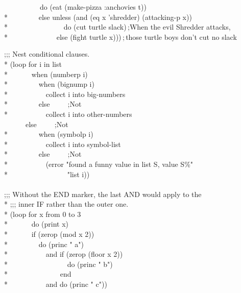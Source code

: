 \begin{defloop}
\begin{lisp}
~~~~~~~~~~do (eat (make-pizza :anchovies t)) \\*
~~~~~~~~else unless (and (eq x 'shredder) (attacking-p x))\\*
~~~~~~~~~~~~~~~do (cut turtle slack)\,;\textrm{When the evil Shredder attacks,} \\*
~~~~~~~~~~~~~else (fight turtle x)))\,;\,\textrm{those turtle boys don't cut no slack}
\end{lisp}
\goodbreak
\begin{lisp}
;;; Nest conditional clauses. \\*
(loop for i in list \\*
~~~~~~when (numberp i) \\*
~~~~~~~~when (bignump i) \\*
~~~~~~~~~~collect i into big-numbers \\*
~~~~~~~~else~~~~~;\textrm{Not } \\*
~~~~~~~~~~collect i into other-numbers \\
~~~~~~else~~~~~;\textrm{Not } \\*
~~~~~~~~when (symbolp i)  \\*
~~~~~~~~~~collect i into symbol-list \\*
~~~~~~~~else~~~~~;\textrm{Not } \\*
~~~~~~~~~~(error "found a funny value in list {\Xtilde}S, value {\Xtilde}S{\Xtilde}\%" \\*
~~~~~~~~~~~~~~~~"list i)) \\
 \\
;;; Without the END marker, the last AND would apply to the \\*
;;; inner IF rather than the outer one. \\*
(loop for x from 0 to 3  \\*
~~~~~~do (print x) \\*
~~~~~~if (zerop (mod x 2)) \\*
~~~~~~~~do (princ " a") \\*
~~~~~~~~~~and if (zerop (floor x 2)) \\*
~~~~~~~~~~~~~~~~do (princ " b") \\*
~~~~~~~~~~~~~~end \\*
~~~~~~~~~~and do (princ " c"))
\end{lisp}


\end{defloop}
